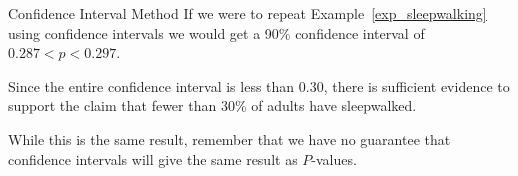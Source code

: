 \documentclass{beamer}
\begin{document}
\begin{frame}
\begin{block}{Confidence Interval Method}
If we were to repeat Example~\ref{exp_sleepwalking} using confidence intervals we would get a 90\% confidence interval of $0.287<p<0.297$.\pause

\vspace{1mm}
Since the entire confidence interval is less than 0.30, there is sufficient evidence to support the claim that fewer than 30\% of adults have sleepwalked.
\end{block}\pause

\begin{note}
While this is the same result, remember that we have no guarantee that confidence intervals will give the same result as $P$-values.
\end{note}
\end{frame}
\end{document}
